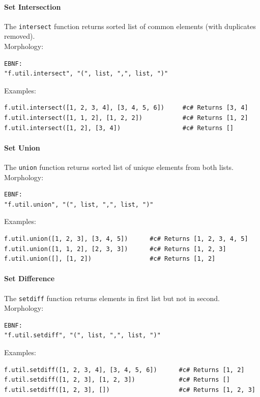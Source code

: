 \paragraph{Set Intersection}
The \texttt{intersect} function returns sorted list of common elements (with duplicates removed).\\
Morphology:
\begin{verbatim}
EBNF:
"f.util.intersect", "(", list, ",", list, ")"
\end{verbatim}
Examples:
\begin{verbatim}
f.util.intersect([1, 2, 3, 4], [3, 4, 5, 6])     #c# Returns [3, 4]
f.util.intersect([1, 1, 2], [1, 2, 2])           #c# Returns [1, 2]
f.util.intersect([1, 2], [3, 4])                 #c# Returns []
\end{verbatim}

\paragraph{Set Union}
The \texttt{union} function returns sorted list of unique elements from both lists.\\
Morphology:
\begin{verbatim}
EBNF:
"f.util.union", "(", list, ",", list, ")"
\end{verbatim}
Examples:
\begin{verbatim}
f.util.union([1, 2, 3], [3, 4, 5])      #c# Returns [1, 2, 3, 4, 5]
f.util.union([1, 1, 2], [2, 3, 3])      #c# Returns [1, 2, 3]
f.util.union([], [1, 2])                #c# Returns [1, 2]
\end{verbatim}

\paragraph{Set Difference}
The \texttt{setdiff} function returns elements in first list but not in second.\\
Morphology:
\begin{verbatim}
EBNF:
"f.util.setdiff", "(", list, ",", list, ")"
\end{verbatim}
Examples:
\begin{verbatim}
f.util.setdiff([1, 2, 3, 4], [3, 4, 5, 6])      #c# Returns [1, 2]
f.util.setdiff([1, 2, 3], [1, 2, 3])            #c# Returns []
f.util.setdiff([1, 2, 3], [])                   #c# Returns [1, 2, 3]
\end{verbatim}

